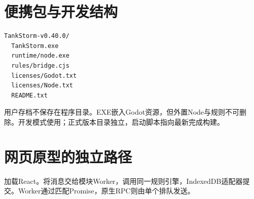 \Needspace{55mm}
\section{便携包与开发结构}
\begin{lstlisting}
TankStorm-v0.40.0/
  TankStorm.exe
  runtime/node.exe
  rules/bridge.cjs
  licenses/Godot.txt
  licenses/Node.txt
  README.txt
\end{lstlisting}
用户存档不保存在程序目录。EXE嵌入Godot资源，但外置Node与规则不可删除。开发模式使用；正式版本目录独立，启动脚本指向最新完成构建。

\section{网页原型的独立路径}
加载React。将消息交给模块Worker，调用同一规则引擎，IndexedDB适配器提交。Worker通过匹配Promise，原生RPC则由单个排队发送。

